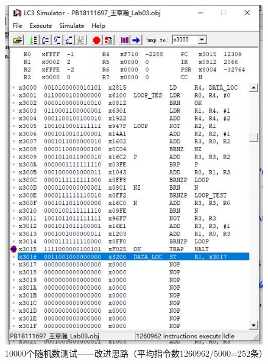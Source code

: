 \documentclass[UTF8]{article}
\begin{document}
\begin{figure}[H]
\begin{minipage}[H]{0.33\linewidth}
			\includegraphics[scale=0.33]{data0_2.jpg}
			\caption{10000个随机数测试——改进思路（平均指令数1260962/5000=252条）}
			\label{data0_2}
		\end{minipage}
		\begin{minipage}[H]{0.33\linewidth}
			\centering

\end{minipage}
\end{figure}
\end{document}
